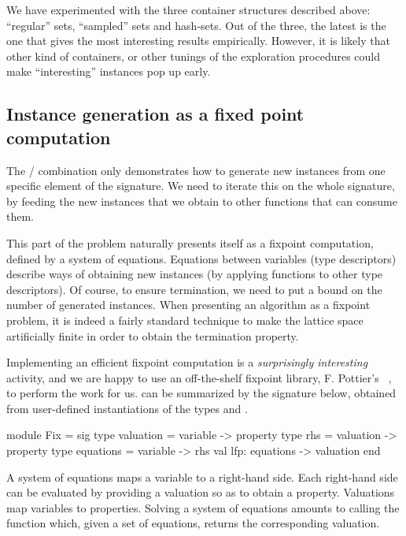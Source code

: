 We have experimented with the three container structures described
above: ``regular'' sets, ``sampled'' sets and hash-sets. Out of the
three, the latest is the one that gives the most interesting results
empirically.
%
However, it is likely that other kind of containers, or other tunings
of the exploration procedures could make ``interesting'' instances pop
up early.

\subsection{Instance generation as a fixed point computation}

The / combination only demonstrates how to generate
new instances from one specific element of the signature. We need to iterate
this on the whole signature, by feeding the new instances that we
obtain to other functions that can consume them.

This part of the problem naturally presents itself as a fixpoint computation,
defined by a system of equations. Equations between variables (type descriptors)
describe ways of obtaining new instances (by applying functions to other type
descriptors). Of course, to ensure termination, we need to put a bound on the
number of generated instances. When presenting an algorithm as a fixpoint
problem, it is indeed a fairly standard technique to make the lattice space
artificially finite in order to obtain the termination property.

Implementing an efficient fixpoint computation is a \emph{surprisingly
interesting} activity, and we are happy to use an off-the-shelf fixpoint
library, F. Pottier's ~\cite{fix},
to perform the work for us.  can be summarized by the signature
below, obtained from user-defined instantiations of the types 
and .
%
\begin{ocamlcode}
module Fix = sig
  type valuation = variable -> property
  type rhs = valuation -> property
  type equations = variable -> rhs
  val lfp: equations -> valuation end
\end{ocamlcode}
%
A system of equations maps a variable to a right-hand side.  Each right-hand
side can be evaluated by providing a valuation so as to obtain a property.
Valuations map variables to properties. Solving a system of equations amounts to
calling the  function which, given a set of equations, returns the
corresponding valuation.

